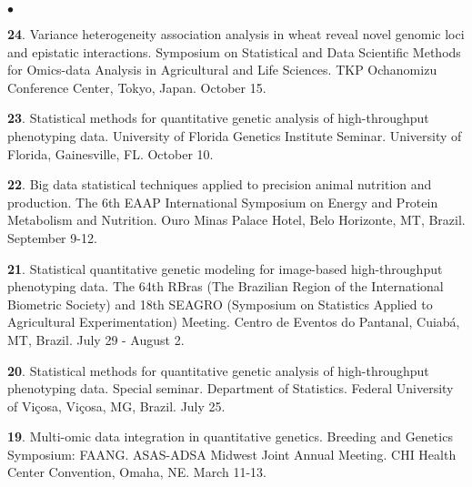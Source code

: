 \documentclass[margin,line,10pt]{res}
\newenvironment{list2}{
  \begin{list}{$\bullet$}{%
      \setlength{\itemsep}{0in}
      \setlength{\parsep}{0in} \setlength{\parskip}{0in}
      \setlength{\topsep}{0in} \setlength{\partopsep}{0in} 
      \setlength{\leftmargin}{0.2in}}}{\end{list}}
\begin{document}
\begin{resume}
\begin{list2}
  \vspace{0.5cm}
  
   \item [{\bf 24}.] Variance heterogeneity association analysis in wheat reveal novel genomic loci and epistatic interactions. Symposium on Statistical and Data Scientific Methods for Omics-data Analysis in Agricultural and Life Sciences. TKP Ochanomizu Conference Center, Tokyo, Japan. October 15.

     \vspace{0.5cm}
    
  \item [{\bf 23}.] Statistical methods for quantitative genetic analysis of high-throughput phenotyping data.  University of Florida Genetics Institute Seminar. University of Florida, Gainesville, FL. October 10.

    \vspace{0.5cm}
    
\item [{\bf 22}.]  Big data statistical techniques applied to precision animal nutrition and production. The 6th EAAP International Symposium on Energy and Protein Metabolism and Nutrition. Ouro Minas Palace Hotel, Belo Horizonte, MT, Brazil. September 9-12.

  \vspace{0.5cm}
  
 \item [{\bf 21}.] Statistical quantitative genetic modeling for image-based high-throughput phenotyping data. The 64th RBras (The Brazilian  Region  of the International Biometric Society) and 18th SEAGRO (Symposium on Statistics Applied to Agricultural Experimentation) Meeting. Centro de Eventos do Pantanal, Cuiab{\'a}, MT, Brazil. July 29 - August 2.

   \vspace{0.5cm}

   
 \item [{\bf 20}.]      
     Statistical methods for quantitative genetic analysis of high-throughput phenotyping data. Special seminar. Department of Statistics. Federal University of Vi\c cosa, Vi\c cosa, MG, Brazil. July 25.
   
    
   \vspace{0.5cm}
   
   \item [{\bf 19}.]  Multi-omic data integration in quantitative genetics. Breeding and Genetics Symposium: FAANG. ASAS-ADSA Midwest Joint Annual Meeting. CHI Health Center Convention, Omaha, NE. March 11-13.


\end{list2}
\end{resume}
\end{document}
